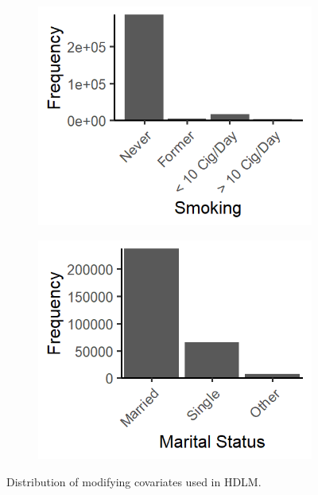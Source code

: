 \documentclass[12pt]{article}
\begin{document}
\begin{figure}[!ht]
\begin{subfigure}{.3\textwidth}
        \includegraphics[width=\textwidth]{supp-img/dens_smk.png}
    \end{subfigure}\hfill
    \begin{subfigure}{.3\textwidth}
        \includegraphics[width=\textwidth]{supp-img/dens_marital.png}
    \end{subfigure}
    \caption{Distribution of modifying covariates used in HDLM.}
    \label{fig:mod-dens}
\end{figure}
\end{document}

